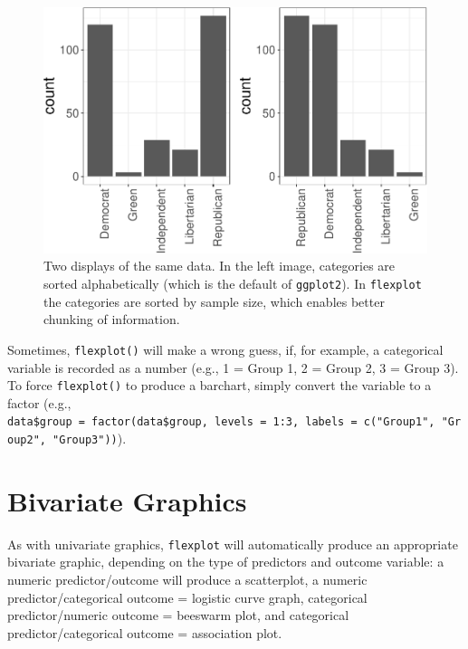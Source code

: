 \documentclass[
  man]{apa6}
\begin{document}
\begin{figure}
\centering
\includegraphics{flexplot_psychmeth_files/figure-latex/chunkit-1.pdf}
\caption{\label{fig:chunkit}Two displays of the same data. In the left image, categories are sorted alphabetically (which is the default of \texttt{ggplot2}). In \texttt{flexplot} the categories are sorted by sample size, which enables better chunking of information. \label{fig:chunkit}}
\end{figure}

Sometimes, \texttt{flexplot()} will make a wrong guess, if, for example, a categorical variable is recorded as a number (e.g., 1 = Group 1, 2 = Group 2, 3 = Group 3). To force \texttt{flexplot()} to produce a barchart, simply convert the variable to a factor (e.g., \texttt{data\$group\ =\ factor(data\$group,\ levels\ =\ 1:3,\ labels\ =\ c("Group1",\ "Group2",\ "Group3"))}).

\hypertarget{bivariate-graphics}{%
\section{Bivariate Graphics}\label{bivariate-graphics}}

As with univariate graphics, \texttt{flexplot} will automatically produce an appropriate bivariate graphic, depending on the type of predictors and outcome variable: a numeric predictor/outcome will produce a scatterplot, a numeric predictor/categorical outcome = logistic curve graph, categorical predictor/numeric outcome = beeswarm plot, and categorical predictor/categorical outcome = association plot.
\end{document}
